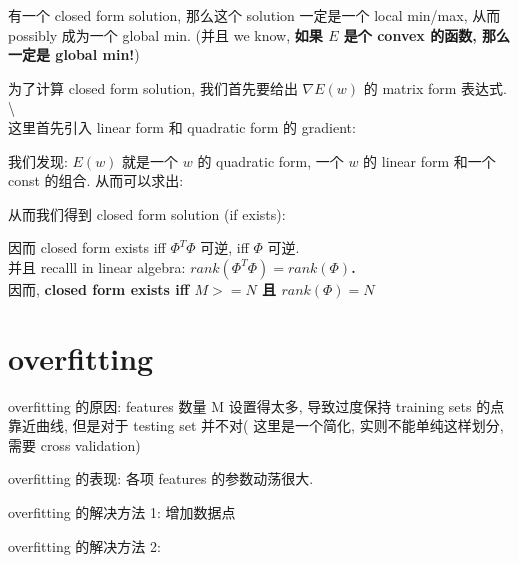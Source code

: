 \documentclass[lang=cn,11pt]{elegantbook}
\begin{document}
有一个 closed form solution, 那么这个 solution 一定是一个 local min/max,
从而 possibly 成为一个 global min. (并且 we know, \textbf{如果 \(E\)
是个 convex 的函数, 那么一定是 global min!})

为了计算 closed form solution, 我们首先要给出 \(\nabla E(w)\) 的 matrix
form 表达式. \textbackslash{}\\
这里首先引入 linear form 和 quadratic form 的 gradient:


我们发现: \(E(w)\) 就是一个 \(w\) 的 quadratic form, 一个 \(w\) 的
linear form 和一个 const 的组合. 从而可以求出:


从而我们得到 closed form solution (if exists):


因而 closed form exists iff \(\Phi^T\Phi\) 可逆, iff \(\Phi\) 可逆.\\
并且 recalll in linear algebra:
\textbf{\(rank(\Phi^T\Phi) = rank(\Phi)\).}\\
因而, \textbf{closed form exists iff \(M >= N \) 且 \(rank(\Phi) = N\)}

\hypertarget{overfitting}{%
\section{overfitting}\label{overfitting}}



overfitting 的原因: features 数量 M 设置得太多, 导致过度保持 training
sets 的点靠近曲线, 但是对于 testing set 并不对( 这里是一个简化,
实则不能单纯这样划分, 需要 cross validation)


overfitting 的表现: 各项 features 的参数动荡很大.


overfitting 的解决方法 1: 增加数据点


overfitting 的解决方法 2:
\end{document}
